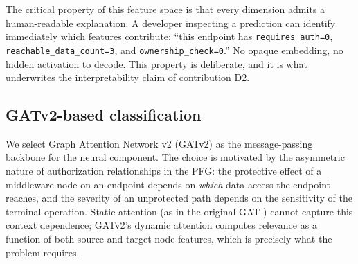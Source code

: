 The critical property of this feature space is that every dimension admits a
human-readable explanation. A developer inspecting a prediction can identify
immediately which features contribute: ``this endpoint has
\texttt{requires\_auth=0}, \texttt{reachable\_data\_count=3}, and
\texttt{ownership\_check=0}.'' No opaque embedding, no hidden activation to
decode. This property is deliberate, and it is what underwrites the
interpretability claim of contribution D2.

\subsection{GATv2-based classification}
\label{sec:det-gnn}

We select Graph Attention Network v2 (GATv2) \citep{brody2021attentive} as
the message-passing backbone for the neural component. The choice is
motivated by the asymmetric nature of authorization relationships in the
PFG: the protective effect of a middleware node on an endpoint depends on
\emph{which} data access the endpoint reaches, and the severity of an
unprotected path depends on the sensitivity of the terminal operation.
Static attention (as in the original GAT \citep{velivckovic2018graph}) cannot
capture this context dependence; GATv2's dynamic attention computes
relevance as a function of both source and target node features, which is
precisely what the problem requires.


